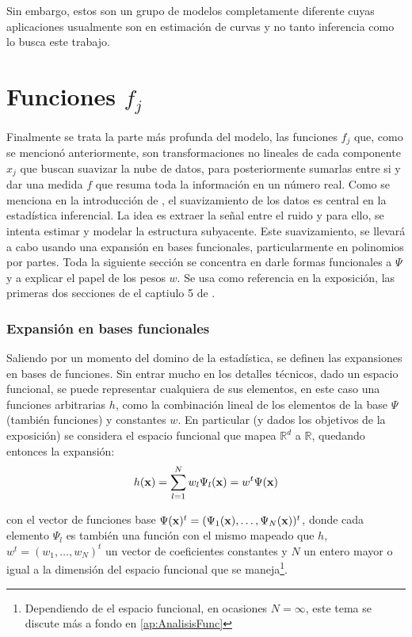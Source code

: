 \documentclass[../Main/Main.tex]{subfiles}
\begin{document}
Sin embargo, estos son un grupo de modelos completamente diferente cuyas aplicaciones usualmente son en estimación de curvas y no tanto inferencia como lo busca este trabajo.

\section{Funciones $f_j$} \label{sec:fj}

Finalmente se trata la parte más profunda del modelo, las funciones $f_j$  que, como se mencionó anteriormente, son transformaciones no lineales de cada componente $x_j$ que buscan suavizar la nube de datos, para posteriormente sumarlas entre si y dar una medida $f$ que resuma toda la información en un número real. Como se menciona en la introducción de \autocite{hardle2004semiparametric}, el suavizamiento de los datos es central en la estadística inferencial. La idea es extraer la señal entre el ruido y para ello, se intenta estimar y modelar la estructura subyacente. Este suavizamiento, se llevará a cabo usando una expansión en bases funcionales, particularmente en polinomios por partes. Toda la siguiente sección se concentra en darle formas funcionales a $\Psi$ y a explicar el papel de los pesos $w$. Se usa como referencia en la exposición, las primeras dos secciones de el captiulo 5 de \autocite{hastie2008elements}. \\

\subsubsection{Expansión en bases funcionales}
Saliendo por un momento del domino de la estadística, se definen las expansiones en bases de funciones. Sin entrar mucho en los detalles técnicos, dado un espacio funcional, se puede representar cualquiera de sus elementos, en este caso una funciones arbitrarias $h$, como la combinación lineal de los elementos de la base $\Psi$ (también funciones) y constantes $w$. En particular (y dados los objetivos de la exposición) se considera el espacio funcional que mapea $\mathbb{R}^d$ a $\mathbb{R}$, quedando entonces la expansión: 
\begin{align} 
	h(\mathbf{x}) = \sum_{l = 1}^N w_l\Psi_l(\mathbf{x}) = w^t\Psi(\mathbf{x}) \label{ec:ExpansionBases2}
\end{align}

con el vector de funciones base $\Psi(\mathbf{x})^t = (\Psi_1(\mathbf{x}),\ldots,\Psi_N(\mathbf{x}))^t$, donde cada elemento $\Psi_l$ es también una función con el mismo mapeado que $h$, $w^t = (w_1,\ldots,w_N)^t$  un vector de coeficientes constantes y $N$ un entero mayor o igual a la dimensión del espacio funcional que se maneja\footnote{Dependiendo de el espacio funcional, en ocasiones $N = \infty$, este tema se discute más a fondo en \ref{ap:AnalisisFunc}}.\\
\end{document}
